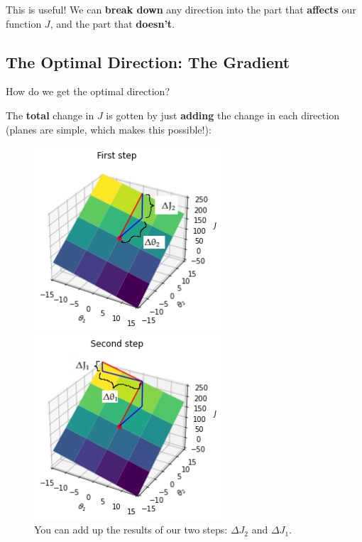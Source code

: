         This is useful! We can \textbf{break down} any direction into the part that \textbf{affects} our function $J$, and the part that \textbf{doesn't}.
        
        
    
    \subsection{The Optimal Direction: The Gradient}
    
        How do we get the optimal direction?
        
        The \textbf{total} change in $J$ is gotten by just \textbf{adding} the change in each direction (planes are simple, which makes this possible!):
        
        \begin{figure}[H]
        
                \includegraphics[width=70mm,scale=0.5]{images/gradient_descent_images/first_step.png}
                
                \includegraphics[width=70mm,scale=0.5]{images/gradient_descent_images/second_step.png}
                
            \caption*{You can add up the results of our two steps: $\Delta J_2$ and $\Delta J_1$.}
        \end{figure}
        
